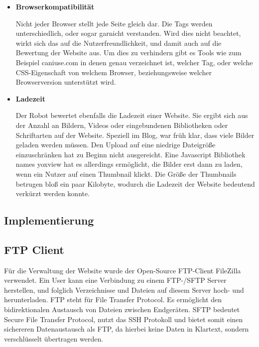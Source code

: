 {\begin{itemize}
      \item \textbf{Browserkompatibilität}

        Nicht jeder Browser stellt jede Seite gleich dar. Die Tags werden unterschiedlich, oder sogar garnicht verstanden. Wird dies nicht beachtet, wirkt sich das auf die Nutzerfreundlichkeit,
        und damit auch auf die Bewertung der Website aus. Um dies zu verhindern gibt es Tools wie zum Beispiel caniuse.com in denen genau verzeichnet ist, welcher Tag, oder welche CSS-Eigenschaft
        von welchem Browser, beziehungsweise welcher Browserversion unterstützt wird.

      \item \textbf{Ladezeit}

        Der Robot bewertet ebenfalls die Ladezeit einer Website. Sie ergibt sich aus der Anzahl an Bildern, Videos oder eingebundenen Bibliotheken oder Schriftarten auf der Website.
        Speziell im Blog, war früh klar, dass viele Bilder geladen werden müssen. Den Upload auf eine niedrige Dateigröße einzuschränken hat zu Beginn nicht ausgereicht.
        Eine Javascript Bibliothek names yoxview hat es allerdings ermöglicht, die Bilder erst dann zu laden, wenn ein Nutzer auf einen Thumbnail klickt. Die Größe der Thumbnails betrugen bloß
        ein paar Kilobyte, wodurch die Ladezeit der Website bedeutend verkürzt werden konnte.

    \end{itemize}

  \subsection{Implementierung}

    \subsection*{FTP Client}
    Für die Verwaltung der Website wurde der Open-Source FTP-Client {FileZilla\cite{filezilla}} verwendet. Ein User kann eine Verbindung zu einem FTP-/SFTP
    Server herstellen, und folglich Verzeichnisse und Dateien auf diesem Server hoch- und herunterladen. {FTP\cite{ftp}} steht für File Transfer Protocol. Es ermöglicht
    den bidirektionalen Austausch von Dateien zwischen Endgeräten. {SFTP\cite{sftp}} bedeutet Secure File Transfer Protocol, nutzt das SSH Protokoll und bietet somit
    einen sichereren Datenaustausch als FTP, da hierbei keine Daten in Klartext, sondern verschlüsselt übertragen werden.

}
